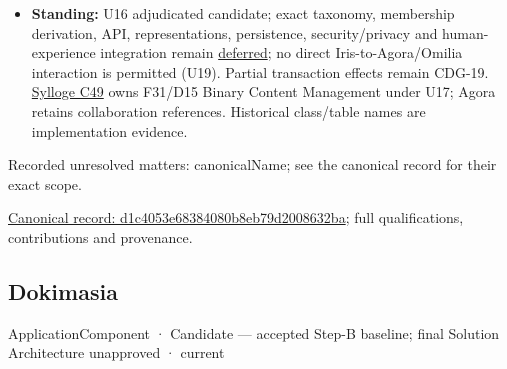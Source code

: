 \begin{itemize}
\item \textbf{Standing:} U16 adjudicated candidate; exact taxonomy, membership derivation,
  API, representations, persistence, security/privacy and human-experience
  integration remain \hyperref[element:d1c4053e68384080b8eb79d2008632ba]{deferred};
  no direct Iris-to-Agora/Omilia interaction is permitted (U19).
  Partial transaction effects remain CDG-19. \hyperref[element:feea742463b84021b66853d287d8916f]{Sylloge C49} owns F31/D15
  Binary Content Management under U17; Agora retains collaboration references.
  Historical class/table names are implementation evidence.

\end{itemize}

{\small Recorded unresolved matters: canonicalName; see the canonical record for their exact scope.}\par
{\footnotesize \href{../../../../continuum/application/application-component/d1c4053e68384080b8eb79d2008632ba.md}{Canonical record: d1c4053e68384080b8eb79d2008632ba}; full qualifications, contributions and provenance.}\par
\subsection{Dokimasia}

\label{element:d739c75dffe2453081735710b285f03b}
{\small ApplicationComponent · Candidate — accepted Step-B baseline; final Solution Architecture unapproved · current}\par

